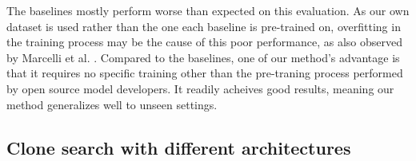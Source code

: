 The baselines mostly perform worse than expected on this evaluation. As our own dataset is used
rather than the one each baseline is pre-trained on, overfitting in the training process may be the cause of this poor performance,
as also observed by Marcelli et al. \cite{cisco}. Compared to the baselines, one of our method's advantage is that it requires no
specific training other than the pre-traning process performed by open source model developers. It readily acheives good results,
meaning our method generalizes well to unseen settings.

\subsection{Clone search with different architectures}

{
    \renewcommand{\arraystretch}{1.3}
    \begin{table}[!t]
    \centering
\end{table}}
